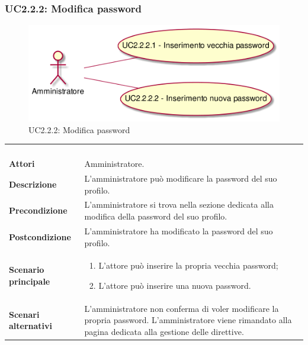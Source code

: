 \subsubsection{UC2.2.2: Modifica password}
\label{UC2.2.2}
\begin{figure}[h]
\centering
\includegraphics[width=\textwidth,height=\textheight,keepaspectratio]{images/UseCaseUC222.png}
\caption{UC2.2.2: Modifica password}
\end{figure}
\begin{longtable}{l|p{10cm}}
\rowcolor[gray]{0.8} \multicolumn{2}{c}{} \\
\rowcolor[gray]{0.8} \multicolumn{2}{c}{\textbf{UC2.2.2 - Modifica password}} \\
\rowcolor[gray]{0.8} \multicolumn{2}{c}{} \\
\hline
&\\
\textbf{Attori} & Amministratore.\\[7pt]
\textbf{Descrizione} & L'amministratore può modificare la password del suo profilo.\\[7pt]
\textbf{Precondizione} & L'amministratore si trova nella sezione dedicata alla modifica della password del suo profilo.\\[7pt]
\textbf{Postcondizione} & L'amministratore ha modificato la password del suo profilo.\\[7pt]
\textbf{Scenario principale} &\begin{enumerate}
\item  L'attore può inserire la propria vecchia password;
\item  L'attore può inserire una nuova password.
\end{enumerate}
\\[7pt]
\textbf{Scenari alternativi} & L'amministratore non conferma di voler modificare la propria password. L'amministratore viene rimandato alla pagina dedicata alla gestione delle direttive.\\[7pt]\hline
\end{longtable}

